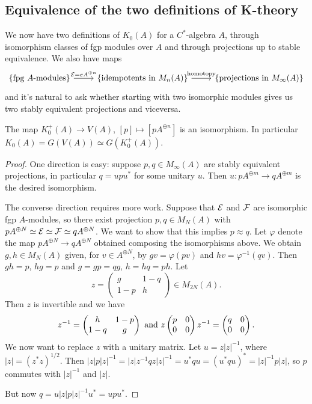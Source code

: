 \subsection{Equivalence of the two definitions of K-theory}
\noindent We now have two definitions of $K_0(A)$ for a $C^\ast$-algebra $A$, through isomorphism classes of fgp modules over $A$ and through projections up to stable equivalence. We also have maps $$\begin{tikzcd}\{\text{fpg $A$-modules}\}\arrow["\E=eA^{\oplus n}",r]&\{\text{idempotents in $M_n(A)$}\}\arrow["\text{homotopy}",r]&\{\text{projections in $M_\infty(A)$}\} \end{tikzcd}$$
and it's natural to ask whether starting with two isomorphic modules gives us two stably equivalent projections and viceversa.
\begin{theorem}
 The map $K_0^+(A)\to V(A)$, $[p]\mapsto[pA^{\oplus n}]$ is an isomorphism. In particular $K_0(A)=G(V(A))\simeq G(K_0^+(A))$.
\end{theorem}
\begin{proof}
 One direction is easy: suppose $p,q\in M_\infty(A)$ are stably equivalent projections, in particular $q=upu^\ast$ for some unitary $u$. Then $u\colon pA^{\oplus m}\to qA^{\oplus m}$ is the desired isomorphism.
 
 \noindent The converse direction requires more work. Suppose that $\mathcal{E}$ and $\mathcal{F}$ are isomorphic fgp $A$-modules, so there exist projection $p,q\in M_N(A)$ with $pA^{\oplus N}\simeq\mathcal{E}\simeq\mathcal{F}\simeq qA^{\oplus N}$. We want to show that this implies $p\approx q$. Let $\varphi$ denote the map $pA^{\oplus N}\to qA^{\oplus N}$ obtained composing the isomorphisms above. We obtain $g,h\in M_N(A)$ given, for $v\in A^{\oplus N}$, by $gv=\varphi(pv)$ and $hv=\varphi^{-1}(qv)$. Then $gh=p$, $hg=p$ and $g=gp=qg$, $h=hq=ph$. Let $$z=\begin{pmatrix}g & 1-q \\ 1-p & h\end{pmatrix}\in M_{2N}(A).$$
 Then $z$ is invertible and we have $$z^{-1}=\begin{pmatrix} h & 1-p \\ 1-q & g\end{pmatrix}\text{  and  } z\begin{pmatrix} p & 0 \\ 0 & 0\end{pmatrix}z^{-1}=\begin{pmatrix} q & 0 \\ 0 & 0\end{pmatrix}.$$
 We now want to replace $z$ with a unitary matrix. Let $u=z|z|^{-1}$, where $|z|=(z^\ast z)^{1/2}$. Then $|z|p|z|^{-1}=|z|z^{-1}qz|z|^{-1}=u^\ast q u=(u^\ast qu)^\ast=|z|^{-1}p|z|$, so $p$ commutes with $|z|^{-1}$ and $|z|$.
 
 \noindent But now $q=u|z|p|z|^{-1}u^\ast=upu^\ast$.
\end{proof}

